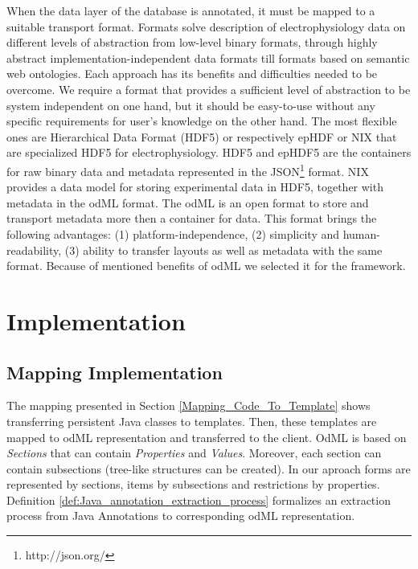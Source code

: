 \documentclass[conference]{IEEEtran}
\begin{document}
When the data layer of the database is annotated, it must be mapped to a suitable transport format. Formats solve description of electrophysiology data on different levels of abstraction from low-level binary formats, through highly abstract implementation-independent data formats till formats based on semantic web ontologies. Each approach has its benefits and difficulties needed to be overcome. We require a format that provides a sufficient level of abstraction to be system independent on one hand, but it should be easy-to-use without any specific requirements for user's knowledge on the other hand. The most flexible ones are Hierarchical Data Format (HDF5) \cite{hdf5} or respectively epHDF or NIX \cite{nix} that are specialized HDF5 for electrophysiology. HDF5 and epHDF5 are the containers for raw binary data and metadata represented in the JSON\footnote{http://json.org/} format. NIX \cite{Stoewer:2014}  provides a data model for storing experimental data in HDF5, together with metadata in the odML format. The odML \cite{10.3389/fninf.2011.00016} is an open format to store and transport metadata more then a container for data. This format brings the following advantages: (1) platform-independence, (2) simplicity and human-readability, (3) ability to transfer layouts as well as metadata with the same format. Because of mentioned benefits of odML we selected it for the framework. 


\section{Implementation}


\subsection{Mapping Implementation}


The mapping presented in Section \ref{Mapping_Code_To_Template} shows transferring persistent Java classes to templates. Then, these templates are mapped to odML representation and transferred to the client. OdML is based on \textit{Sections} that can contain \textit{Properties} and \textit{Values}. Moreover, each section can contain subsections (tree-like structures can be created). In our aproach forms are represented by sections, items by subsections and restrictions by properties. Definition \ref{def:Java_annotation_extraction_process} formalizes an extraction process from Java Annotations to corresponding odML representation.
\end{document}
